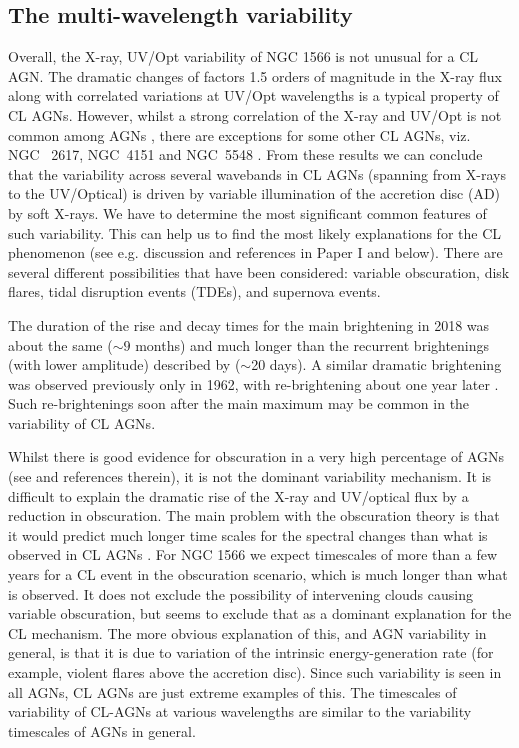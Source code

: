 \documentclass[fleqn,usenatbib]{mnras}
\begin{document}
\subsection{The multi-wavelength variability}
Overall, the X-ray, UV/Opt variability of NGC 1566 is not unusual for a CL AGN. The dramatic changes of factors 1.5 orders of magnitude in the X-ray flux along with correlated variations at UV/Opt wavelengths is a typical property of CL AGNs. However, whilst a strong correlation of the X-ray and UV/Opt is not common among  AGNs \citep[see e.g.,][] {Edelson2000, Buisson2017}, there are exceptions for some other CL AGNs, viz. NGC~ 2617, NGC~4151 and NGC~5548 \citep[see e.g.,][]{Shappee2014, Oknyansky2017a, Edelson2017, Mchardy2014}. From these results we can conclude that the variability across several wavebands in CL AGNs (spanning from X-rays to the  UV/Optical) is driven by variable illumination of the accretion disc (AD) by soft X-rays. We have to determine the most significant common features of such variability.  This can help us to find the most likely explanations for the CL phenomenon (see e.g. discussion and references in Paper I and below).  There are several different possibilities that have been considered: variable obscuration, disk flares, tidal disruption events (TDEs), and supernova events.

The duration  of the rise and decay  times  for the  main brightening in 2018 was about the same ($\sim 9$ months) and much longer than the recurrent brightenings (with lower amplitude) described by \cite{Alloin1986} ($\sim$20 days).  A similar dramatic brightening was observed previously only in 1962, with re-brightening about one year later \cite{Quintana1975}. Such re-brightenings soon after the main maximum may be common in the variability of CL AGNs.   

Whilst there is good evidence for obscuration in a very high percentage of AGNs (see \citealt{Gaskell17} and references therein), it is not the dominant variability mechanism.  It is difficult to explain the dramatic rise of the X-ray and UV/optical flux by a reduction in obscuration. The main problem with the obscuration theory is that it would predict much longer time scales for the spectral changes than what is observed in CL AGNs \citep[see e.g.,][]{Sheng2017}. For NGC 1566 we expect timescales of more than a few years for a CL event in the obscuration scenario, which is much longer than what is observed.  It does not exclude the possibility of intervening clouds causing variable obscuration, but seems to exclude that as a dominant explanation for the CL mechanism. The more obvious explanation of this, and AGN variability in general, is that it is due to variation of the intrinsic energy-generation rate (for example, violent flares above the accretion disc).  Since such variability is seen in all AGNs, CL AGNs are just extreme examples of this.  The timescales of variability of CL-AGNs at various wavelengths are similar to the variability timescales of AGNs in general.  
\end{document}
